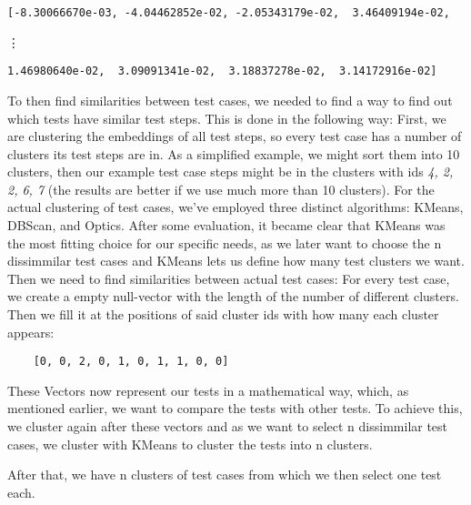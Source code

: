 \begin{Verbatim}
[-8.30066670e-03, -4.04462852e-02, -2.05343179e-02,  3.46409194e-02,
\end{Verbatim}
\vdots
\begin{Verbatim}
1.46980640e-02,  3.09091341e-02,  3.18837278e-02,  3.14172916e-02]
\end{Verbatim}

To then find similarities between test cases, we needed to find a way to find out which tests have similar test steps. This is done in the following way:
First, we are clustering the embeddings of all test steps, so every test case has a number of clusters its test steps are in. As a simplified example, we might sort them into 10 clusters, then our example test case steps might be in the clusters with ids \emph{4, 2, 2, 6, 7} (the results are better if we use much more than 10 clusters).
For the actual clustering of test cases, we've employed three distinct algorithms: KMeans, DBScan, and Optics. After some evaluation, it became   clear that KMeans was the most fitting choice for our specific needs, as we later want to choose the n dissimmilar test cases and KMeans lets us define how many test clusters we want.
Then we need to find similarities between actual test cases:
For every test case, we create a empty null-vector with the length of the number of different clusters. Then we fill it at the positions of said cluster ids with how many each cluster appears:

\begin{Verbatim}
    [0, 0, 2, 0, 1, 0, 1, 1, 0, 0]
\end{Verbatim}

These Vectors now represent our tests in a mathematical way, which, as mentioned earlier, we want to compare the tests with other tests.
To achieve this, we cluster again after these vectors and as we want to select n dissimmilar test cases, we cluster with KMeans to cluster the tests into n clusters.

After that, we have n clusters of test cases from which we then select one test each. 